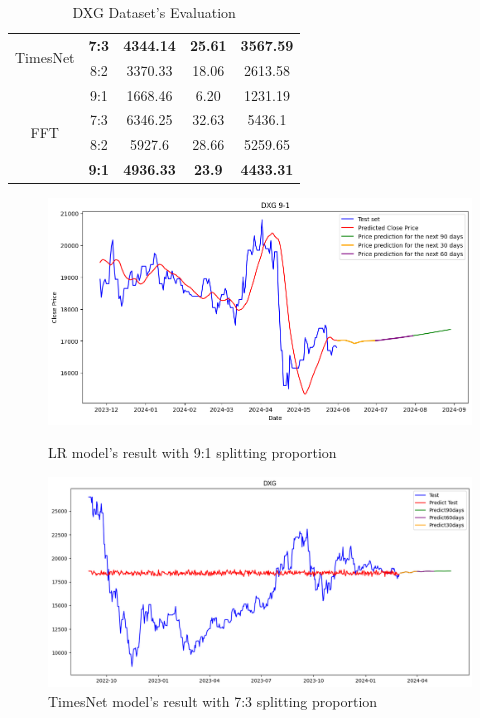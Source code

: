\documentclass{ieeeojies}
\begin{document}
\begin{table}[H]
\begin{tabular}{|c|c|c|c|c|}
         \hline
         \multirow{2}{*}{TimesNet} & \textbf{7:3} & \textbf{4344.14} & \textbf{25.61} & \textbf{3567.59} \\ & 8:2 & 3370.33 & 18.06 & 2613.58 \\ & 9:1 & 1668.46	& 6.20 &1231.19\\
         \hline
         \multirow{2}{*}{FFT} & 7:3 & 6346.25 &  32.63&  5436.1 \\ & 8:2 & 5927.6 &  28.66 &  5259.65 \\ & \textbf{9:1} & \textbf{4936.33} & \textbf{23.9} & \textbf{4433.31}\\
         \hline
    \end{tabular}
    \caption{DXG Dataset's Evaluation}

    \label{vcbresult}
\end{table}
\begin{figure}[H]
  \centering
  \begin{minipage}{0.23\textwidth}
  \centering
  \includegraphics[width=1\textwidth]{bibliography/Figure/LR_DXG(9-1).png}
  \caption{LR  model's result with 9:1 splitting proportion}
  \label{fig:1}
  \end{minipage}
  \hfill
  \begin{minipage}{0.23\textwidth}
  \centering
  \includegraphics[width=1\textwidth]{bibliography/Figure/DXG_TimesNet(7-3).png}
  \caption{TimesNet model's result with 7:3 splitting proportion}
  \label{fig:2}
  \end{minipage}
\end{figure}
\end{document}
